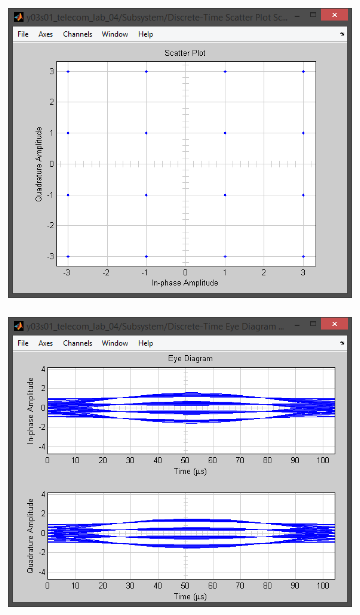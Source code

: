 \documentclass[
	a4paper,
	oneside,
	BCOR = 10mm,
	DIV = 12,
	12pt,
	headings = normal,
]{scrartcl}
\begin{document}
\begin{figure}[!htbp]
\begin{subfigure}{\textwidth / 3}
						\caption{}
						\label{subfig:rolloff-1p0-signal-trajectory-in}
					\end{subfigure}%
					\begin{subfigure}{\textwidth / 3}
						\centering
						\includegraphics[height = 7\baselineskip]{../01-solution/rolloff-1p0-scatter-plot-in.png}
						\caption{}
						\label{subfig:rolloff-1p0-scatter-plot-in}
					\end{subfigure}
					\begin{subfigure}{\textwidth / 3}
						\centering
						\includegraphics[height = 7\baselineskip]{../01-solution/rolloff-1p0-eye-diag-out.png}

\end{subfigure}
\end{figure}
\end{document}
